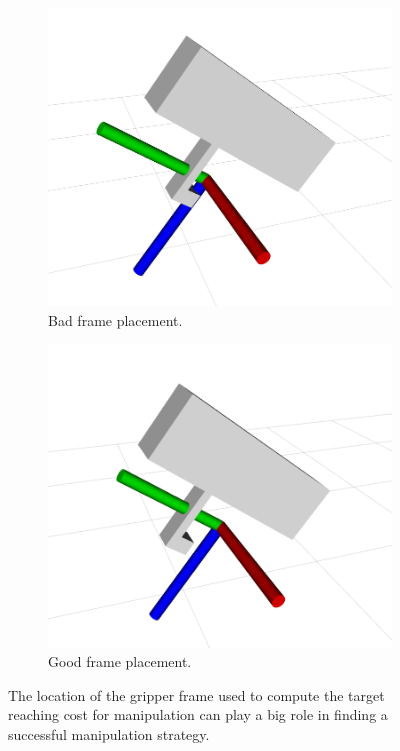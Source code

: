 \begin{figure}[t]
\centering
\begin{subfigure}{0.48\columnwidth}
    \includegraphics[width=\linewidth]{figures/panda_grasp_2.png}
    \caption{Bad frame placement.}
\end{subfigure}%
\hfill
\begin{subfigure}{0.48\columnwidth}
    \includegraphics[width=\linewidth]{figures/panda_grasp_1.png}
    \caption{Good frame placement.}
\end{subfigure}%
\hfill
\caption{The location of the gripper frame used to compute the target reaching cost for manipulation can play a big role in finding a successful manipulation strategy.}\label{fig:frame_placement}
\end{figure}

